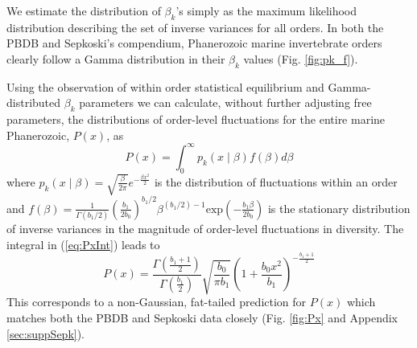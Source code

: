 \documentclass[12pt]{article}
\begin{document}
We estimate the distribution of $\beta_k$'s simply as the maximum
likelihood distribution describing the set of inverse variances for
all orders. In both the PBDB and Sepkoski's compendium, Phanerozoic
marine invertebrate orders clearly follow a Gamma distribution in
their $\beta_k$ values (Fig. \ref{fig:pk_f}).  

Using the observation of within order statistical equilibrium and
Gamma-distributed $\beta_k$ parameters we can calculate, without
further adjusting free parameters, the distributions of order-level
fluctuations for the entire marine Phanerozoic, $P(x)$, as
\begin{equation}
  P(x) = \int_0^\infty p_k(x \mid \beta) f(\beta) d\beta \label{eq:PxInt}
\end{equation}
where
$p_k(x \mid \beta) = \sqrt{\frac{\beta}{2\pi}} e^{-\frac{\beta
    x^2}{2}}$ is the distribution of fluctuations within an order and
$f(\beta) = \frac{1}{\Gamma(b_1/2)}
\left(\frac{b_1}{2b_0}\right)^{b_1/2} \beta^{(b_1/2) - 1}
\text{exp}\left(-\frac{b_1 \beta}{2 b_0}\right)$ is the stationary
distribution of inverse variances in the magnitude of order-level
fluctuations in diversity. The integral in (\ref{eq:PxInt}) leads to
\begin{equation}
  P(x) = \frac{\Gamma\left(\frac{b_1 +
        1}{2}\right)}{\Gamma\left(\frac{b_1}{2}\right)}
  \sqrt{\frac{b_0}{\pi b_1}} \left(1 + \frac{b_0
      x^2}{b_1}\right)^{-\frac{b_1 + 1}{2}}
\end{equation}
This corresponds to a non-Gaussian, fat-tailed prediction for
$P(x)$ which matches both the PBDB and Sepkoski data closely
(Fig. \ref{fig:Px} and Appendix \ref{sec:suppSepk}).
\end{document}
